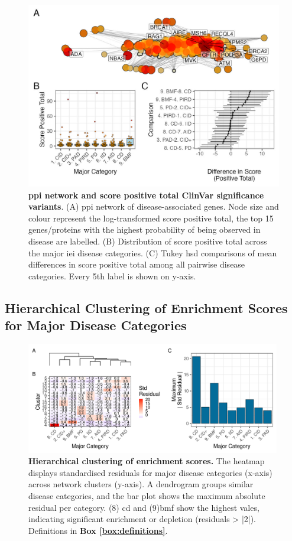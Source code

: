 \begin{figure}[ht]
  \centering
  \includegraphics[width=\textwidth]{../images/untangleR_ppi_network_assoc_patch1.jpg}
  \caption{\textbf{\ac{ppi} network and score positive total ClinVar significance variants}.
    (A) \ac{ppi} network of disease-associated genes. Node size and colour represent the log-transformed score positive total, the top 15 genes/proteins with the highest probability of being observed in disease are labelled.
    (B) Distribution of score positive total across the major \ac{iei} disease categories.
    (C) Tukey \ac{hsd} comparisons of mean differences in score positive total among all pairwise disease categories. Every 5th label is shown on y-axis.
  }
  \label{fig:ppi_network_assoc}
\end{figure}

\FloatBarrier
\subsection{Hierarchical Clustering of Enrichment Scores for Major Disease Categories}
\begin{figure}[ht]
  \centering
  \includegraphics[width=0.99\textwidth]{../images/untangleR_ppi_network_patch2_cator.pdf}
  \caption{
   \textbf{Hierarchical clustering of enrichment scores.}
    The heatmap displays standardised residuals for major disease categories (x-axis) across network clusters (y-axis). A dendrogram groups similar disease categories, and the bar plot shows the maximum absolute residual per category.  (8) \ac{cd} and (9)\ac{bmf} show the highest vales, indicating significant enrichment or depletion (residuals > |2|). Definitions in \textbf{Box \ref{box:definitions}}.
  }
  \label{fig:patch2}
\end{figure}

